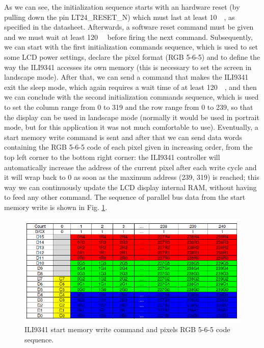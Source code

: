 \documentclass[11pt]{report}
\begin{document}
As we can see, the initialization sequence starts with an hardware reset (by pulling down the pin LT24\_RESET\_N) which must last at least \SI{10}{\micro\sec}, as specified in the datasheet. Afterwards, a software reset command must be given and we must wait at least \SI{120}{\milli\sec} before firing the next command. Subsequently, we can start with the first initialization commands sequence, which is used to set some LCD power settings, declare the pixel format (RGB 5-6-5) and to define the way the ILI9341 accesses its own memory (this is necessary to set the screen in landscape mode). After that, we can send a command that makes the ILI9341 exit the sleep mode, which again requires a wait time of at least \SI{120}{\milli\sec}, and then we can conclude with the second initialization commands sequence, which is used to set the column range from 0 to 319 and the row range from 0 to 239, so that the display can be used in landscape mode (normally it would be used in portrait mode, but for this application it was not much comfortable to use). Eventually, a start memory write command is sent and after that we can send data words containing the RGB 5-6-5 code of each pixel given in increasing order, from the top left corner to the bottom right corner: the ILI9341 controller will automatically increase the address of the current pixel after each write cycle and it will wrap back to 0 as soon as the maximum address (239, 319) is reached; this way we can continuously update the LCD display internal RAM, without having to feed any other command. The sequence of parallel bus data from the start memory write is shown in Fig. \ref{fig:pixel_sequence}.

\begin{figure}[!h]
    \centering
    \includegraphics[width=1\linewidth]{images/graphic_interface_design/LT24_LCD_driver/write_pixels_sequence.png}
    \caption{ILI9341 start memory write command and pixels RGB 5-6-5 code sequence.}
    \label{fig:pixel_sequence}
\end{figure}
\end{document}
